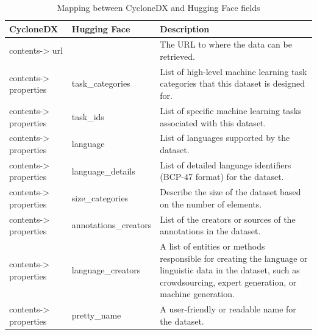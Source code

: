 \documentclass[12pt,a4paper, oneside, openright]{book}
\begin{document}
\begin{table}[h!]
    \centering
    \begin{tabular}{|p{5cm}|p{4cm}|p{4cm}|}
        \hline
        \textbf{CycloneDX} & \textbf{Hugging Face} & \textbf{Description}\\ \hline
                    contents-> url
            & 
            & The URL to where the data can be retrieved.
        \\ \hline 
            contents-> properties    
           & task\_categories
           & List of high-level machine learning task categories that this dataset is designed for.
        \\ \hline
            contents-> properties
            & task\_ids
            & List of specific machine learning tasks associated with this dataset.
        \\ \hline    
            contents-> properties
            & language
            & List of languages supported by the dataset.
        \\ \hline 
            contents-> properties
            & language\_details
            & List of detailed language identifiers (BCP-47 format) for the dataset.
        \\ \hline
            contents-> properties
            & size\_categories
            & Describe the size of the dataset based on the number of elements.
        \\ \hline
            contents-> properties
            & annotations\_creators
            & List of the creators or sources of the annotations in the dataset.
        \\ \hline
            contents-> properties
            & language\_creators
            & A list of entities or methods responsible for creating the language or linguistic data in the dataset, such as crowdsourcing, expert generation, or machine generation.
        \\ \hline
            contents-> properties
            & pretty\_name
            & A user-friendly or readable name for the dataset.
        \\ \hline
    \end{tabular}
\caption{Mapping between CycloneDX and Hugging Face fields}
    \label{tab:cyclonedx_huggingface}
\end{table}
\end{document}
